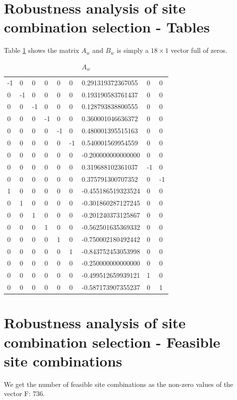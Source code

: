 \documentclass{article}
\begin{document}
\section{Robustness analysis of site combination selection - Tables}
Table \ref{tab:aw} shows the matrix $A_w$ and $B_w$ is simply a $18\times 1$ vector full of zeros.
\begin{table}[H]
	\centering
	\caption{$A_w$}
	\label{tab:aw}
	\begin{tabular}{lllllllll}
		-1 & 0  & 0  & 0  & 0  & 0  & 0.291319372367055  & 0  & 0  \\
		0  & -1 & 0  & 0  & 0  & 0  & 0.193190583761437  & 0  & 0  \\
		0  & 0  & -1 & 0  & 0  & 0  & 0.128793838800555  & 0  & 0  \\
		0  & 0  & 0  & -1 & 0  & 0  & 0.360001046636372  & 0  & 0  \\
		0  & 0  & 0  & 0  & -1 & 0  & 0.480001395515163  & 0  & 0  \\
		0  & 0  & 0  & 0  & 0  & -1 & 0.540001569954559  & 0  & 0  \\
		0  & 0  & 0  & 0  & 0  & 0  & -0.200000000000000 & 0  & 0  \\
		0  & 0  & 0  & 0  & 0  & 0  & 0.319688102361037  & -1 & 0  \\
		0  & 0  & 0  & 0  & 0  & 0  & 0.375791300707352  & 0  & -1 \\
		1  & 0  & 0  & 0  & 0  & 0  & -0.455186519323524 & 0  & 0  \\
		0  & 1  & 0  & 0  & 0  & 0  & -0.301860287127245 & 0  & 0  \\
		0  & 0  & 1  & 0  & 0  & 0  & -0.201240373125867 & 0  & 0  \\
		0  & 0  & 0  & 1  & 0  & 0  & -0.562501635369332 & 0  & 0  \\
		0  & 0  & 0  & 0  & 1  & 0  & -0.750002180492442 & 0  & 0  \\
		0  & 0  & 0  & 0  & 0  & 1  & -0.843752453053998 & 0  & 0  \\
		0  & 0  & 0  & 0  & 0  & 0  & -0.250000000000000 & 0  & 0  \\
		0  & 0  & 0  & 0  & 0  & 0  & -0.499512659939121 & 1  & 0  \\
		0  & 0  & 0  & 0  & 0  & 0  & -0.587173907355237 & 0  & 1 
	\end{tabular}
\end{table}
\section{Robustness analysis of site combination selection - Feasible site combinations}
We get the number of feasible site combinations as the non-zero values of the vector F: 736.
\end{document}
